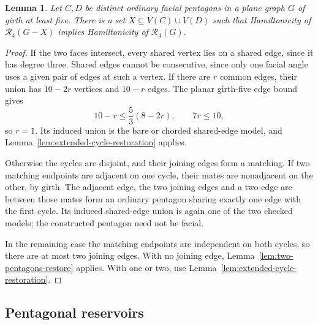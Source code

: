 \documentclass[11pt]{article}
\newtheorem{lemma}[theorem]{Lemma}
\theoremstyle{remark}
\newcommand{\R}{\mathcal R}
\numberwithin{equation}{section}
\numberwithin{table}{section}
\begin{document}
\begin{lemma}\label{lem:any-two-ordinary}
Let $C,D$ be distinct ordinary facial pentagons in a plane graph $G$
of girth at least five. There is a set $X\subseteq V(C)\cup V(D)$
such that Hamiltonicity of $\R_4(G-X)$ implies Hamiltonicity of
$\R_4(G)$.
\end{lemma}
\begin{proof}
If the two faces intersect, every shared vertex lies on a shared edge,
since it has degree three. Shared edges cannot be consecutive, since
only one facial angle uses a given pair of edges at such a vertex.
If there are $r$ common edges, their union has $10-2r$ vertices and
$10-r$ edges. The planar girth-five edge bound gives
\[
 10-r\le\frac53(8-2r),\qquad 7r\le10,
\]
so $r=1$. Its induced union is the bare or chorded shared-edge model,
and Lemma~\ref{lem:extended-cycle-restoration} applies.

Otherwise the cycles are disjoint, and their joining edges form a
matching. If two matching endpoints are adjacent on one cycle, their
mates are nonadjacent on the other, by girth. The adjacent edge, the
two joining edges and a two-edge arc between those mates form an
ordinary pentagon sharing exactly one edge with the first cycle.
Its induced shared-edge union is again one of the two checked models;
the constructed pentagon need not be facial.

In the remaining case the matching endpoints are independent on both
cycles, so there are at most two joining edges. With no joining edge,
Lemma~\ref{lem:two-pentagons-restore} applies. With one or two, use
Lemma~\ref{lem:extended-cycle-restoration}.
\end{proof}

\subsection{Pentagonal reservoirs}
\end{document}
